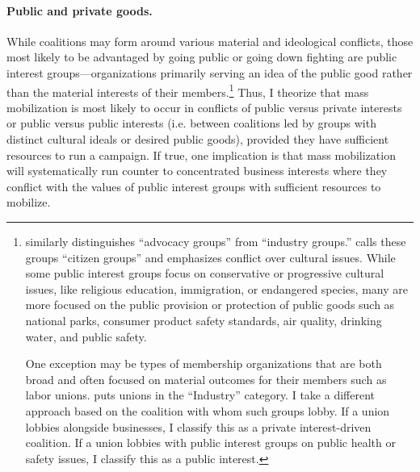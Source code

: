 \begin{subhyp}

\paragraph{Public and private goods.} While coalitions may form around various material and ideological conflicts, those most likely to be advantaged by going public or going down fighting are public interest groups---organizations primarily serving an idea of the public good rather than the material interests of their members.\footnote{\citet{Potter2017} similarly distinguishes ``advocacy groups'' from ``industry groups.'' \citet{Berry1999} calls these groups ``citizen groups'' and emphasizes conflict over cultural issues. While some public interest groups focus on conservative or progressive cultural issues, like religious education, immigration, or endangered species, many are more focused on the public provision or protection of public goods such as national parks, consumer product safety standards, air quality, drinking water, and public safety.

One exception may be types of membership organizations that are both broad and often focused on material outcomes for their members such as labor unions. \citet{Potter2017} puts unions in the ``Industry'' category. I take a different approach based on the coalition with whom such groups lobby. If a union lobbies alongside businesses, I classify this as a private interest-driven coalition. If a union lobbies with public interest groups on public health or safety issues, I classify this as a public interest.} Thus, I theorize that mass mobilization is most likely to occur in conflicts of public versus private interests or public versus public interests (i.e. between coalitions led by groups with distinct cultural ideals or desired public goods), provided they have sufficient resources to run a campaign.
If true, one implication is that mass mobilization will systematically run counter to concentrated business interests where they conflict with the values of public interest groups with sufficient resources to mobilize.



\end{subhyp}
